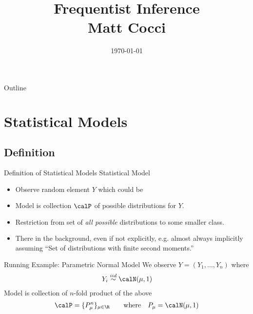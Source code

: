\documentclass[aspectratio=169, handout]{beamer}
\title[]{Frequentist Inference \\ Matt Cocci}
\author[]{}
\date{\today}
\newcommand{\iid}{\overset{iid}{\sim}}
\begin{document}
\begin{frame}[plain]
\titlepage
\end{frame}

\begin{frame}{Outline}
\tableofcontents[hideallsubsections]
\end{frame}

\section{Statistical Models}

\subsection{Definition}

{\footnotesize
\begin{frame}{Definition of Statistical Models}
\alert{Statistical Model}
\begin{itemize}
  \item Observe random element $Y$ which could be
  \pause
  \item \alert{Model} is collection $\calP$ of
    \alert{possible distributions} for $Y$.
  \pause
  \item Restriction from set of \emph{all possible} distributions to
    some smaller class.
  \item There in the background, even if not explicitly, e.g.
    almost always implicitly assuming ``Set of distributions with finite
    second moments.''
\end{itemize}
\end{frame}
}


{\footnotesize
\begin{frame}{Running Example: Parametric Normal Model}
We observe $Y=(Y_1,\ldots,Y_n)$ where
\begin{align*}
  Y_i \iid \calN(\mu,1)
\end{align*}
Model is collection of $n$-fold product of the above
\begin{align*}
  \calP = \{P_\mu^n\}_{\mu\in \R}
  \qquad\text{where}\quad
  P_\mu = \calN(\mu,1)
\end{align*}
\end{frame}
}
\end{document}
